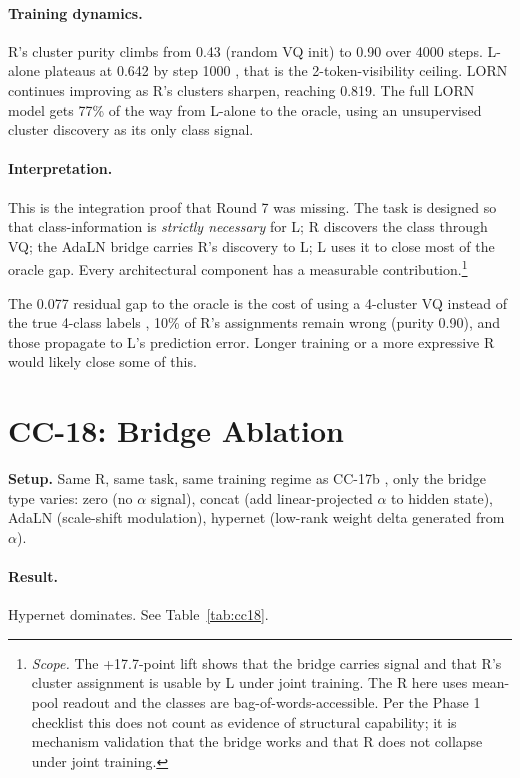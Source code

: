 \documentclass[10pt, twocolumn, a4paper]{article}
\begin{document}
\paragraph{Training dynamics.} R's cluster purity climbs from 0.43 (random VQ init) to 0.90 over 4000 steps. L-alone plateaus at 0.642 by step 1000 ,  that is the 2-token-visibility ceiling. LORN continues improving as R's clusters sharpen, reaching 0.819. The full LORN model gets 77\% of the way from L-alone to the oracle, using an unsupervised cluster discovery as its only class signal.

\paragraph{Interpretation.} This is the integration proof that Round 7 was missing. The task is designed so that class-information is \emph{strictly necessary} for L; R discovers the class through VQ; the AdaLN bridge carries R's discovery to L; L uses it to close most of the oracle gap. Every architectural component has a measurable contribution.\footnote{\emph{Scope.} The +17.7-point lift shows that the bridge carries signal and that R's cluster assignment is usable by L under joint training. The R here uses mean-pool readout and the classes are bag-of-words-accessible. Per the Phase 1 checklist this does not count as evidence of structural capability; it is mechanism validation that the bridge works and that R does not collapse under joint training.}

The 0.077 residual gap to the oracle is the cost of using a 4-cluster VQ instead of the true 4-class labels ,  10\% of R's assignments remain wrong (purity 0.90), and those propagate to L's prediction error. Longer training or a more expressive R would likely close some of this.

\section{CC-18: Bridge Ablation}

\textbf{Setup.} Same R, same task, same training regime as CC-17b ,  only the bridge type varies: zero (no $\alpha$ signal), concat (add linear-projected $\alpha$ to hidden state), AdaLN (scale-shift modulation), hypernet (low-rank weight delta generated from $\alpha$).

\paragraph{Result.} Hypernet dominates. See Table~\ref{tab:cc18}.
\end{document}
